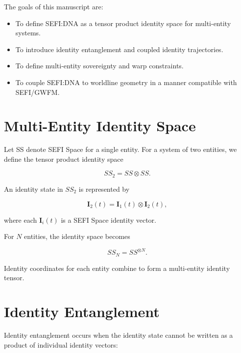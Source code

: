 \documentclass[12pt,twoside]{article}
\begin{document}
The goals of this manuscript are:

\begin{itemize}
    \item To define SEFI:DNA as a tensor product identity space for multi-entity systems.
    \item To introduce identity entanglement and coupled identity trajectories.
    \item To define multi-entity sovereignty and warp constraints.
    \item To couple SEFI:DNA to worldline geometry in a manner compatible with SEFI/GWFM.
\end{itemize}

\section{Multi-Entity Identity Space}

Let SS denote SEFI Space for a single entity. For a system of two entities, we define the
tensor product identity space



\[
SS_{2} = SS \otimes SS.
\]



An identity state in $SS_{2}$ is represented by



\[
\mathbf{I}_{2}(t) = \mathbf{I}_{1}(t) \otimes \mathbf{I}_{2}(t),
\]



where each $\mathbf{I}_{i}(t)$ is a SEFI Space identity vector.

For $N$ entities, the identity space becomes



\[
SS_{N} = SS^{\otimes N}.
\]



Identity coordinates for each entity combine to form a multi-entity identity tensor.

\section{Identity Entanglement}

Identity entanglement occurs when the identity state cannot be written as a product of
individual identity vectors:
\end{document}
